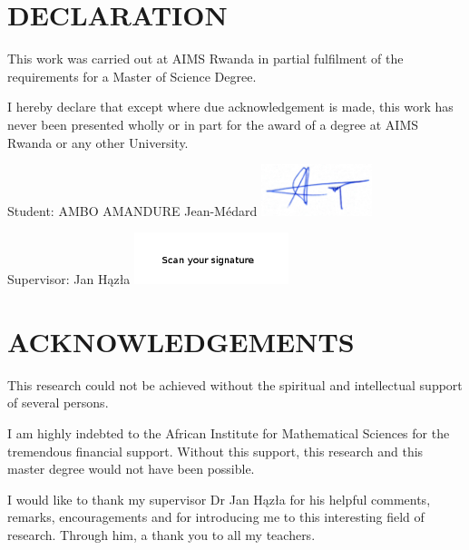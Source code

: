 \chapter*{DECLARATION}
This work was carried out at AIMS Rwanda in partial fulfilment of the requirements for a Master of Science Degree.

I hereby declare that except where due acknowledgement is made, this work has never been presented wholly or in part for the award of a degree at AIMS Rwanda or any other University.

\vspace{1.5cm}
Student: AMBO AMANDURE Jean-Médard  \includegraphics[height=1.5cm]{images/signatureAMBO.jpg}

\vspace{1.5cm}

Supervisor: Jan Hązła \includegraphics[height=1.5cm]{images/signature1.png}


\newpage

\chapter*{ACKNOWLEDGEMENTS}


This research could not be achieved without the spiritual and intellectual support of several persons.

I am highly indebted to the African Institute for Mathematical Sciences for  the tremendous  financial support. Without this support,  this research and this master degree would not have been possible.

I would like to thank my supervisor Dr Jan H{\k{a}}z{\l}a for his helpful comments, remarks, encouragements and for introducing me to this interesting field of research. Through him, a thank you to all my teachers.

